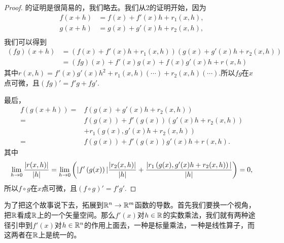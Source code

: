 \documentclass[8pt]{book}
\theoremstyle{plain}%
\begin{document}
\begin{proof}
	的证明是很简易的，我们略去。我们从2的证明开始，因为
	\[
		\begin{split}
			f(x+h)&=f(x)+f'(x)h+r_1(x,h),\\
			g(x+h)&=g(x)+g'(x)h+r_2(x,h),\\
		\end{split}
	\]
	我们可以得到
	\[
		\begin{split}
			(fg)(x+h)&=\left(f(x)+f'(x)h+r_1(x,h)\right)\left(g(x)+g'(x)h+r_2(x,h)\right)\\
			&=(fg)(x)+f'(x)g(x)+f(x)g'(x)h+r(x,h)
		\end{split}
	\]
	其中$r(x,h)=f'(x)g'(x)h^2+r_1(x,h)\left(\cdots\right)+r_2(x,h)\left(\cdots\right)$.所以$fg$在$x$点可微，且$(fg)'=f'g+fg'$.

	最后，
	\[
		\begin{split}
			f\left(g\left(x+h\right)\right)=&f\left(g(x)+g'(x)h+r_2(x,h)\right)\\
			=&f\left(g\left(x\right)\right)+f'\left(g(x)\right)(g'(x)h+r_2(x,h))\\
			&+r_1\left(g(x),g'(x)h+r_2(x,h)\right)\\
			=&f\left(g\left(x\right)\right)+f'\left(g(x)\right)g'(x)h+r(x,h).
		\end{split}
	\]
	其中
	\[
		\lim_{h\to 0}\frac{\arrowvert r(x,h) \arrowvert}{\arrowvert h \arrowvert}=
		\lim_{h\to 0}\left(\arrowvert f'\left(g(x)\right)\arrowvert\frac{\arrowvert r_2(x,h) \arrowvert}{\arrowvert h \arrowvert}+\frac{\arrowvert r_1\left(g(x),g'(x)h+r_2(x,h)\right) \arrowvert}{\arrowvert h \arrowvert}\right)=0,
	\]
	所以$f\circ g$在$x$点可微，且$(f\circ g)'=f'g'$.
\end{proof}
为了把这个故事说下去，拓展到$\mathbb{R}^n\to \mathbb{R}^m$函数的导数。首先我们要换一个视角，把$\mathbb{R}$看成$\mathbb{R}$上的一个矢量空间。那么$f'(x)$对$h\in \mathbb{R}$的实数乘法，我们就有两种途径引申到$f'(x)$对$h\in \mathbb{R}^n$的作用上面去，一种是标量乘法，一种是线性算子，而这两者在$\mathbb{R}$上是统一的。
\end{document}
